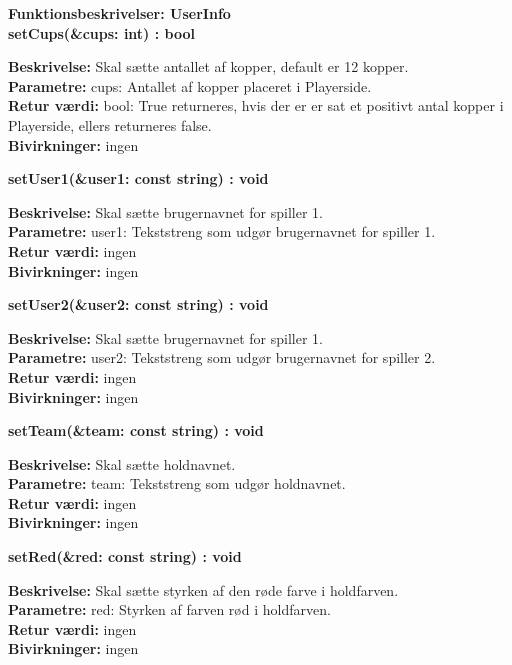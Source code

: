 \documentclass[Arkitektur/System_main.tex]{subfiles}
\begin{document}
{\large\textbf{Funktionsbeskrivelser: UserInfo}}\\[0.2cm]
\textbf{setCups(\&cups: int) : bool}
\begin{adjustwidth}{1cm}{0pt}
\textbf{Beskrivelse:} Skal sætte antallet af kopper, default er 12 kopper.\\
\textbf{Parametre:} cups: Antallet af kopper placeret i Playerside. \\[0.2cm]
\textbf{Retur værdi:} bool: True returneres, hvis der er er sat et positivt antal kopper i Playerside, ellers returneres false. \\[0.2cm]
\textbf{Bivirkninger:} ingen \\[0.2cm]
\end{adjustwidth}

\textbf{setUser1(\&user1: const string) : void}
\begin{adjustwidth}{1cm}{0pt}
\textbf{Beskrivelse:} Skal sætte brugernavnet for spiller 1.\\
\textbf{Parametre:} user1: Tekststreng som udgør brugernavnet for spiller 1. \\[0.2cm]
\textbf{Retur værdi:} ingen \\[0.2cm]
\textbf{Bivirkninger:} ingen \\[0.2cm]
\end{adjustwidth}

\textbf{setUser2(\&user2: const string) : void}
\begin{adjustwidth}{1cm}{0pt}
\textbf{Beskrivelse:} Skal sætte brugernavnet for spiller 1.\\
\textbf{Parametre:} user2: Tekststreng som udgør brugernavnet for spiller 2. \\[0.2cm]
\textbf{Retur værdi:} ingen \\[0.2cm]
\textbf{Bivirkninger:} ingen \\[0.2cm]
\end{adjustwidth}

\textbf{setTeam(\&team: const string) : void}
\begin{adjustwidth}{1cm}{0pt}
\textbf{Beskrivelse:} Skal sætte holdnavnet.\\
\textbf{Parametre:} team: Tekststreng som udgør holdnavnet. \\[0.2cm]
\textbf{Retur værdi:} ingen \\[0.2cm]
\textbf{Bivirkninger:} ingen \\[0.2cm]
\end{adjustwidth}

\textbf{setRed(\&red: const string) : void}
\begin{adjustwidth}{1cm}{0pt}
\textbf{Beskrivelse:} Skal sætte styrken af den røde farve i holdfarven.\\
\textbf{Parametre:} red: Styrken af farven rød i holdfarven. \\[0.2cm]
\textbf{Retur værdi:} ingen \\[0.2cm]
\textbf{Bivirkninger:} ingen \\[0.2cm]
\end{adjustwidth}
\end{document}
